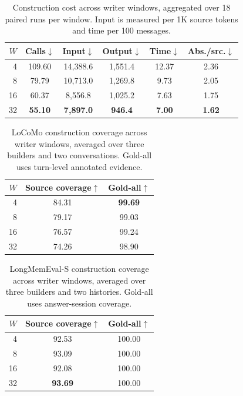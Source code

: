 
\begin{table}[t]
\centering
\small
\caption{Construction cost across writer windows, aggregated over 18 paired runs per window. Input is measured per 1K source tokens and time per 100 messages.}
\label{tab:writer-window-construction}
\begin{tabular}{rccccc}
\toprule
$W$ & Calls$\downarrow$ & Input$\downarrow$ & Output$\downarrow$ & Time$\downarrow$ & Abs./src.$\downarrow$ \\
\midrule
4  & 109.60 & 14,388.6 & 1,551.4 & 12.37 & 2.36 \\
8  & 79.79  & 10,713.0 & 1,269.8 & 9.73  & 2.05 \\
16 & 60.37  & 8,556.8  & 1,025.2 & 7.63  & 1.75 \\
32 & \textbf{55.10} & \textbf{7,897.0} & \textbf{946.4} & \textbf{7.00} & \textbf{1.62} \\
\bottomrule
\end{tabular}
\end{table}

\begin{table}[t]
\centering
\small
\caption{LoCoMo construction coverage across writer windows, averaged over three builders and two conversations. Gold-all uses turn-level annotated evidence.}
\label{tab:writer-window-locomo}
\begin{tabular}{rcc}
\toprule
$W$ & Source coverage$\uparrow$ & Gold-all$\uparrow$ \\
\midrule
4  & 84.31 & \textbf{99.69} \\
8  & 79.17 & 99.03 \\
16 & 76.57 & 99.24 \\
32 & 74.26 & 98.90 \\
\bottomrule
\end{tabular}
\end{table}

\begin{table}[t]
\centering
\small
\caption{LongMemEval-S construction coverage across writer windows, averaged over three builders and two histories. Gold-all uses answer-session coverage.}
\label{tab:writer-window-longmemeval}
\begin{tabular}{rcc}
\toprule
$W$ & Source coverage$\uparrow$ & Gold-all$\uparrow$ \\
\midrule
4  & 92.53 & 100.00 \\
8  & 93.09 & 100.00 \\
16 & 92.08 & 100.00 \\
32 & \textbf{93.69} & 100.00 \\
\bottomrule
\end{tabular}
\end{table}

